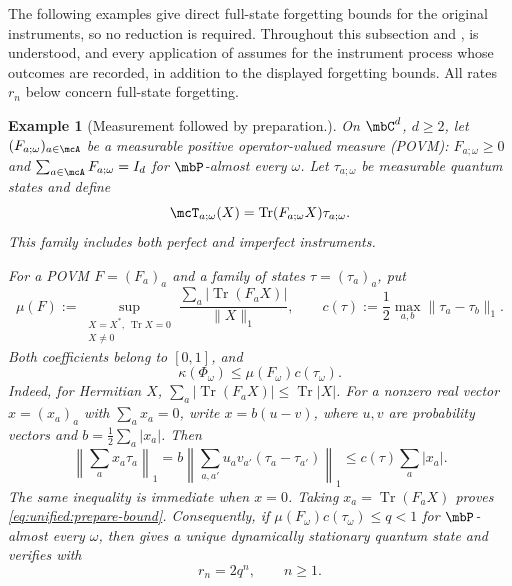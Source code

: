 \documentclass[a4paper]{article}
\numberwithin{equation}{section}   %
\theoremstyle{plain}   %
\theoremstyle{plain}   %
\theoremstyle{examplestyle}
\newtheorem{example}{Example}
\DeclareMathOperator{\pr}{\mbP}           %
\begin{document}
The following examples give direct full-state forgetting bounds for
the original instruments, so no reduction is required.
Throughout this subsection and ,  is understood, and every application of  assumes  for the instrument process whose outcomes are recorded, in addition to the displayed forgetting bounds.
All rates $r_n$ below concern full-state forgetting.

\begin{example}[Measurement followed by preparation.]
\label{eg:measurement-preparation}
    On $\mbC^d$, $d\ge2$, let $(F_{a;\omega})_{a\in\mcA}$  be a measurable positive operator-valued measure (POVM):
    $F_{a;\omega}\ge0$ and $\sum_{a\in\mcA}F_{a;\omega}=I_d$
    for $\pr$-almost every $\omega$.
    Let $\tau_{a;\omega}$ be measurable quantum states and define
    \begin{equation}
    \label{eq:unified:prepare}
         \mcT_{a;\omega}(X)
         =\operatorname{Tr}(F_{a;\omega}X)\tau_{a;\omega}.
    \end{equation}
    This family includes both perfect and imperfect instruments.
    
    For a POVM $F=(F_a)_a$ and a family of states $\tau=(\tau_a)_a$, put
    \[
     \mu(F)
     :=\sup_{\substack{X=X^*,\ \operatorname{Tr}X=0\\X\ne0}}
           \frac{\sum_a|\operatorname{Tr}(F_aX)|}{\|X\|_1},
     \qquad
     c(\tau):=\frac12\max_{a,b}\|\tau_a-\tau_b\|_1.
    \]
    Both coefficients belong to $[0,1]$, and
    \begin{equation}
    \label{eq:unified:prepare-bound}
     \kappa(\Phi_\omega)\le\mu(F_\omega)c(\tau_\omega).
    \end{equation}
    Indeed, for Hermitian $X$, $\sum_a|\operatorname{Tr}(F_aX)|\le\operatorname{Tr}|X|$.
    For a nonzero real vector $x=(x_a)_a$ with $\sum_ax_a=0$, write $x=b(u-v)$, where $u,v$ are probability vectors and  $b=\frac12\sum_a|x_a|$. Then
    \[
         \left\|\sum_ax_a\tau_a\right\|_1
         =b\left\|\sum_{a,a'}u_av_{a'}(\tau_a-\tau_{a'})\right\|_1
         \le c(\tau)\sum_a|x_a|.
    \]
    The same inequality is immediate when $x=0$.
    Taking $x_a=\operatorname{Tr}(F_aX)$ proves \eqref{eq:unified:prepare-bound}.
    Consequently, if $\mu(F_\omega)c(\tau_\omega)\le q<1$ for $\pr$-almost every $\omega$, then  gives a unique dynamically stationary  quantum state and verifies  with
    \[
     r_n=2q^n,\qquad n\ge1.
    \]
\end{example}
\end{document}
